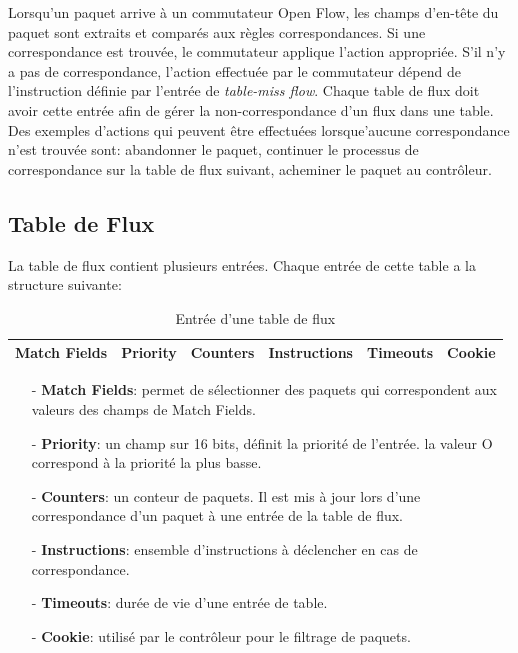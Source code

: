 Lorsqu’un paquet arrive à un commutateur Open Flow, les champs d’en-tête du paquet sont extraits et comparés aux règles correspondances. Si une correspondance est trouvée, le commutateur applique l’action appropriée. S’il n’y a pas de correspondance, l’action effectuée par le commutateur dépend de l’instruction définie par l’entrée de \textit{ table-miss flow}. Chaque table de flux doit avoir cette entrée afin de gérer la non-correspondance d’un flux dans une table. Des exemples d’actions qui peuvent être effectuées lorsque'aucune correspondance n’est trouvée sont: abandonner le paquet, continuer le processus de correspondance sur la table de flux suivant, acheminer le paquet au contrôleur. 

\subsection{Table de Flux}
La table de flux contient plusieurs entrées. Chaque entrée de cette table a la structure suivante:\\
\begin{table}[h]
\begin{center}
\begin{tabular}{ | c | c | c | c | c | c |}
\hline
\rowcolor[rgb]{0.85,0.85,0.85}
Match Fields & Priority & Counters & Instructions & Timeouts & Cookie\\
\hline
\end{tabular}
\caption{Entrée d'une table de flux}
\end{center}
\end{table}
\begin{itemize}

\item[-]\textbf{Match Fields}: permet de sélectionner des paquets qui correspondent aux valeurs des champs de Match Fields.
\item[-]\textbf{Priority}: un champ sur 16 bits, définit la priorité de l'entrée. la valeur O correspond à la priorité la plus basse.
\item[-]\textbf{Counters}: un conteur de paquets. Il est mis à jour lors d'une correspondance d'un paquet à une entrée de la table de flux. 
\item[-]\textbf{Instructions}: ensemble d'instructions à déclencher en cas de correspondance. 
\item[-]\textbf{Timeouts}: durée de vie d'une entrée de table.
\item[-]\textbf{Cookie}: utilisé par le contrôleur pour le filtrage de paquets.\\
\end{itemize}

